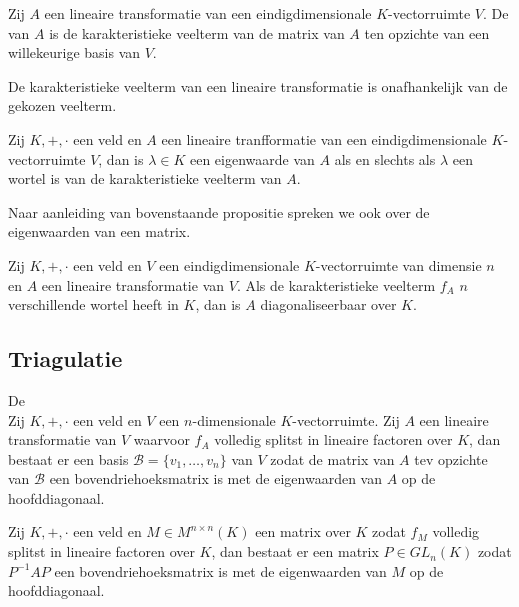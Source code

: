 \documentclass[main.tex]{subfiles}
\begin{document}
\begin{de}
  Zij $A$ een lineaire transformatie van een eindigdimensionale $K$-vectorruimte $V$.
  De  van $A$ is de karakteristieke veelterm van de matrix van $A$ ten opzichte van een willekeurige basis van $V$.
\end{de}

\begin{st}
  De karakteristieke veelterm van een lineaire transformatie is onafhankelijk van de gekozen veelterm.
\end{st}

\begin{pr}
  Zij $K,+,\cdot$ een veld en $A$ een lineaire tranfformatie van een eindigdimensionale $K$-vectorruimte $V$, dan is $\lambda\in K$ een eigenwaarde van $A$ als en slechts als $\lambda$ een wortel is van de karakteristieke veelterm van $A$.
\end{pr}

\begin{de}
  Naar aanleiding van bovenstaande propositie spreken we ook over de eigenwaarden van een matrix.
\end{de}

\begin{gev}
  Zij $K,+,\cdot$ een veld en $V$ een eindigdimensionale $K$-vectorruimte van dimensie $n$ en $A$ een lineaire transformatie van $V$.
  Als de karakteristieke veelterm $f_{A}$ $n$ verschillende wortel heeft in $K$, dan is $A$ diagonaliseerbaar over $K$.
\end{gev}

\subsection{Triagulatie}
\label{sec:triagulatie}

\begin{st}
  De \\
  Zij $K,+,\cdot$ een veld en $V$ een $n$-dimensionale $K$-vectorruimte.
  Zij $A$ een lineaire transformatie van $V$ waarvoor $f_{A}$ volledig splitst in lineaire factoren over $K$, dan bestaat er een basis $\mathcal{B} = \{ v_{1},\dotsc,v_{n} \}$ van $V$ zodat de matrix van $A$ tev opzichte van $\mathcal{B}$ een bovendriehoeksmatrix is met de eigenwaarden van $A$ op de hoofddiagonaal.
\end{st}

\begin{gev}
  Zij $K,+,\cdot$ een veld en $M\in M^{n\times n}(K)$ een matrix over $K$ zodat $f_{M}$ volledig splitst in lineaire factoren over $K$, dan bestaat er een matrix $P\in GL_{n}(K)$ zodat $P^{-1}AP$ een bovendriehoeksmatrix is met de eigenwaarden van $M$ op de hoofddiagonaal.
\end{gev}
\end{document}
